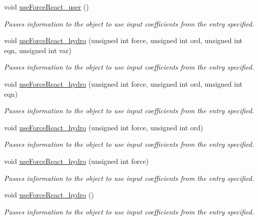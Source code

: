 \begin{DoxyCompactItemize}
void \hyperlink{classosea_1_1ofreq_1_1_motion_model_a6d362d62468bacc57f5be5efe27deb4a}{use\-Force\-React\-\_\-user} ()
\begin{DoxyCompactList}\small\item\em Passes information to the object to use input coefficients from the entry specified. \end{DoxyCompactList}\item 
void \hyperlink{classosea_1_1ofreq_1_1_motion_model_ae3d2c7527ea2daddc6a85b6e02febb45}{use\-Force\-React\-\_\-hydro} (unsigned int force, unsigned int ord, unsigned int eqn, unsigned int var)
\begin{DoxyCompactList}\small\item\em Passes information to the object to use input coefficients from the entry specified. \end{DoxyCompactList}\item 
void \hyperlink{classosea_1_1ofreq_1_1_motion_model_a95f023bebf06d16a31b7b493a46c3ba3}{use\-Force\-React\-\_\-hydro} (unsigned int force, unsigned int ord, unsigned int eqn)
\begin{DoxyCompactList}\small\item\em Passes information to the object to use input coefficients from the entry specified. \end{DoxyCompactList}\item 
void \hyperlink{classosea_1_1ofreq_1_1_motion_model_a51c60631ee1d3546bc1df88c04d50805}{use\-Force\-React\-\_\-hydro} (unsigned int force, unsigned int ord)
\begin{DoxyCompactList}\small\item\em Passes information to the object to use input coefficients from the entry specified. \end{DoxyCompactList}\item 
void \hyperlink{classosea_1_1ofreq_1_1_motion_model_a62b3143f0a56d3cb5d8ffcc7eaf1968e}{use\-Force\-React\-\_\-hydro} (unsigned int force)
\begin{DoxyCompactList}\small\item\em Passes information to the object to use input coefficients from the entry specified. \end{DoxyCompactList}\item 
void \hyperlink{classosea_1_1ofreq_1_1_motion_model_a081dd7c11656da25fafa08f994685e48}{use\-Force\-React\-\_\-hydro} ()
\begin{DoxyCompactList}\small\item\em Passes information to the object to use input coefficients from the entry specified. \end{DoxyCompactList}\item 

\end{DoxyCompactItemize}
